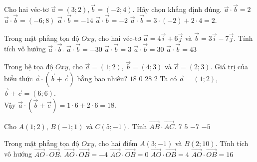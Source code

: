 \begin{ex}%
	Cho hai véc-tơ $\overrightarrow{a}=\left( 3;2 \right),\overrightarrow{b}=\left( -2;4 \right)$. Hãy chọn khẳng định đúng.
	\choice
	{\True $\overrightarrow{a}\cdot \overrightarrow{b}=2$}
	{$\overrightarrow{a}\cdot \overrightarrow{b}=\left( -6;8 \right)$}
	{$\overrightarrow{a}\cdot \overrightarrow{b}=-14$}
	{$\overrightarrow{a}\cdot \overrightarrow{b}=-2$}
	\loigiai
	{$\overrightarrow{a}\cdot \overrightarrow{b}=3 \cdot (-2) + 2 \cdot 4 = 2$.
	}
\end{ex}
\begin{ex}%
	Trong mặt phẳng tọa độ $Oxy$, cho hai véc-tơ $\overrightarrow{a}=4\overrightarrow{i}+6\overrightarrow{j} $ và $\overrightarrow{b}=3\overrightarrow{i}-7\overrightarrow{j} $. Tính tích vô hướng $\overrightarrow{a} \cdot \overrightarrow{b} $. 
	\choice
	{\True $\overrightarrow{a} \cdot \overrightarrow{b}=-30$}
	{$\overrightarrow{a} \cdot \overrightarrow{b}=3$}
	{$\overrightarrow{a} \cdot \overrightarrow{b}=30$}
	{$\overrightarrow{a} \cdot \overrightarrow{b}=43$}
\end{ex}

\begin{ex}%
	Trong hệ tọa độ $Oxy$, cho $\overrightarrow{a} = (1;2)$, $\overrightarrow{b} = (4;3)$ và $\overrightarrow{c} = (2;3)$. Giá trị của biểu thức $\overrightarrow{a} \cdot \left( \overrightarrow{b} + \overrightarrow{c} \right)$ bằng bao nhiêu?
	\choice
	{\True $18$}
	{$0$}
	{$28$}
	{$2$}
	\loigiai
	{
		Ta có $\overrightarrow{a} = (1;2)$, $\overrightarrow{b} + \overrightarrow{c} = (6;6)$.\\
		Vậy $\overrightarrow{a} \cdot \left( \overrightarrow{b} + \overrightarrow{c} \right) = 1 \cdot 6 + 2 \cdot 6 = 18$.
	}
\end{ex}
\begin{ex}%
	Cho $A\left(1;2\right)$, $B\left(-1;1\right)$ và $C\left(5;-1\right)$. Tính $\overrightarrow{AB}\cdot \overrightarrow{AC}$.
	\choice
	{$7$}
	{$5$}
	{$-7$}
	{\True $-5$}
\end{ex}
\begin{ex}%
	Trong mặt phẳng tọa độ $Oxy$, cho hai điểm $A\left(3;-1\right)$ và $B\left(2;10\right)$. Tính tích vô hướng $\overrightarrow{AO}\cdot \overrightarrow{OB}$. 
	\choice
	{$\overrightarrow{AO}\cdot \overrightarrow{OB}=-4$}
	{$\overrightarrow{AO}\cdot \overrightarrow{OB}=0$}
	{\True $\overrightarrow{AO}\cdot \overrightarrow{OB}=4$}
	{$\overrightarrow{AO}\cdot \overrightarrow{OB}=16$}
\end{ex}

